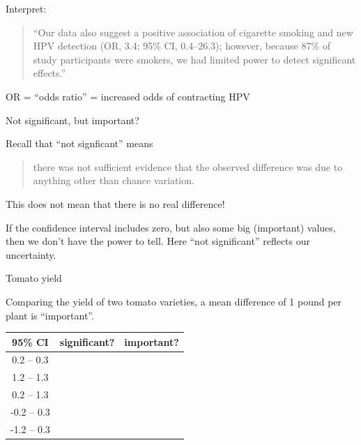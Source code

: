\begin{frame}{Interpret:}

  \begin{quote}
    ``Our data also suggest a positive association of cigarette smoking and new HPV detection (OR, 3.4; 95\% CI, 0.4--26.3); {however, because 87\% of study participants were smokers, we had limited power to detect significant effects.}''
  \end{quote}

  \vspace{2em}

  OR = ``odds ratio'' = increased odds of contracting HPV

\end{frame}


\begin{frame}{Not significant, but important?}

    Recall that ``not signficant'' means
    \begin{quote}
        there was not sufficient evidence that the observed difference was due to anything other than chance variation.
    \end{quote}


    \vspace{2em}

    This does \alert{not} mean that there is no real difference!

    \vspace{2em}

    If the confidence interval includes zero, but also some big (important) values,
    then we don't have the \alert{power} to tell.  
    Here ``not significant'' reflects our uncertainty.



\end{frame}


\begin{frame}{Tomato yield}

    Comparing the yield of two tomato varieties,
    a mean difference of 1 pound per plant is ``important''.

    \vspace{2em}

    \begin{center}
    \begin{tabular}{c|cc}
        95\% CI & significant? & important? \\
        \hline
        0.2 -- 0.3 & & \\
        1.2 -- 1.3 & & \\
        0.2 -- 1.3 & & \\
        -0.2 -- 0.3 & & \\
        -1.2 -- 0.3 & & \\
        \hline
    \end{tabular}
    \end{center}


\end{frame}


